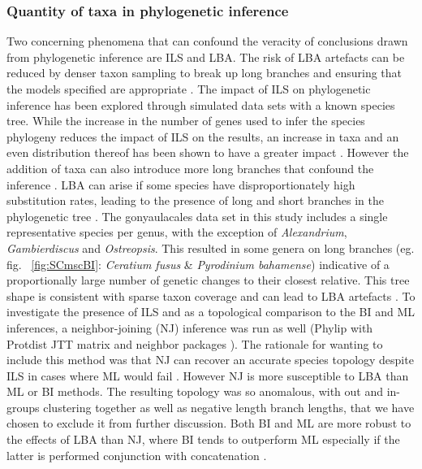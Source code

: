 \documentclass[fleqn,10pt,lineno]{wlpeerj} %
\begin{document}
\subsubsection*{Quantity of taxa in phylogenetic inference}
Two concerning phenomena that can confound the veracity of conclusions drawn from phylogenetic inference are ILS and LBA. 
The risk of LBA artefacts can be reduced by denser taxon sampling to break up long branches and ensuring that the models specified are appropriate \citep{heath2008taxon}. 
The impact of ILS on phylogenetic inference has been explored through simulated data sets with a known species tree. 
While the increase in the number of genes used to infer the species phylogeny reduces the impact of ILS on the results, an increase in taxa and an even distribution thereof has been shown to have a greater impact \citep{maddison2006inferring}.
However the addition of taxa can also introduce more long branches that confound the inference \citep{heath2008taxon}. 
LBA can arise if some species have disproportionately high substitution rates, leading to the presence of long and short branches in the phylogenetic tree \citep{liu2014coalescent}. %
The gonyaulacales data set in this study includes a single representative species per genus, with the exception of \textit{Alexandrium}, \textit{Gambierdiscus} and \textit{Ostreopsis}. 
This resulted in some genera on long branches (eg. fig. ~\ref{fig:SCmscBI}: \textit{Ceratium fusus} \& \textit{Pyrodinium bahamense}) indicative of a proportionally large number of genetic changes to their closest relative.
This tree shape is consistent with sparse taxon coverage and can lead to LBA artefacts \citep{heath2008taxon}. 
To investigate the presence of ILS and as a topological comparison to the BI and ML inferences, a neighbor-joining (NJ) inference was run as well (Phylip with Protdist JTT matrix and neighbor packages \citep{felsenstein2005phylip}). 
The rationale for wanting to include this method was that NJ can recover an accurate species topology despite ILS in cases where ML would fail  \citep{mendes2017concatenation}.
However NJ is more susceptible to LBA than ML or BI methods. 
The resulting topology was so anomalous, with out and in-groups clustering together as well as negative length branch lengths, that we have chosen to exclude it from further discussion. 
Both BI and ML are more robust to the effects of LBA than NJ, where BI tends to outperform ML especially if the latter is performed conjunction with concatenation \citep{kubatko2007inconsistency,roch2015likelihood}. 
\end{document}
